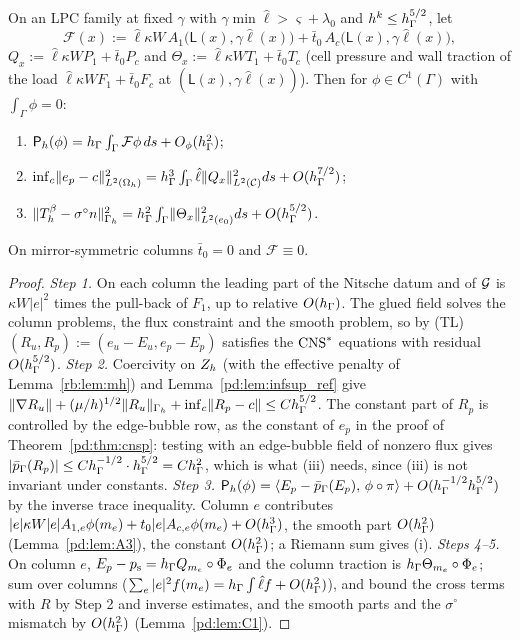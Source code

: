 \begin{theorem}\label{pd:thm:ts}
On an LPC family at fixed $\gamma$ with $\gamma\min\hat\ell>\varsigma+\lambda_0$ and $h^k\le h_\Gamma^{5/2}$, let
\[
\mathcal F(x):=\hat\ell\kappa W\,A_1\bigl(\mathsf L(x),\gamma\hat\ell(x)\bigr)+\bar t_0\,A_c\bigl(\mathsf L(x),\gamma\hat\ell(x)\bigr),
\]
$Q_x:=\hat\ell\kappa WP_1+\bar t_0P_c$ and $\Theta_x:=\hat\ell\kappa WT_1+\bar t_0T_c$ (cell pressure and wall traction of the load $\hat\ell\kappa WF_1+\bar t_0F_c$ at $(\mathsf L(x),\gamma\hat\ell(x))$). Then for $\phi\in C^1(\Gamma)$ with $\int_\Gamma\phi=0$:
\begin{enumerate}[label=(\roman*)]
\item $\mathsf P_h(\phi)=h_\Gamma\int_\Gamma\mathcal F\phi\,ds+O_\phi(h_\Gamma^2)$;
\item $\inf_c\lVert e_p-c\rVert^2_{L^2(\Omega_h)}=h_\Gamma^3\int_\Gamma\hat\ell\lVert Q_x\rVert^2_{L^2(\mathcal C)}ds+O(h_\Gamma^{7/2})$;
\item $\lVert T^\beta_h-\sigma^\circ n\rVert^2_{\Gamma_h}=h_\Gamma^2\int_\Gamma\lVert \Theta_x\rVert^2_{L^2(e_0)}ds+O(h_\Gamma^{5/2})$.
\end{enumerate}
On mirror-symmetric columns $\bar t_0=0$ and $\mathcal F\equiv0$.
\end{theorem}

\begin{proof}
\emph{Step 1.} On each column the leading part of the Nitsche datum and of $\mathcal G$ is $\kappa W|e|^2$ times the pull-back of $F_1$, up to relative $O(h_\Gamma)$. The glued field solves the column problems, the flux constraint and the smooth problem, so by (TL) $(R_u,R_p):=(e_u-E_u,e_p-E_p)$ satisfies the $\mathrm{CNS}^\ast$ equations with residual $O(h_\Gamma^{5/2})$.
\emph{Step 2.} Coercivity on $Z_h$ (with the effective penalty of Lemma~\ref{rb:lem:mh}) and Lemma~\ref{pd:lem:infsup_ref} give $\lVert \nabla R_u\rVert+(\mu/h)^{1/2}\lVert R_u\rVert_{\Gamma_h}+\inf_c\lVert R_p-c\rVert\le Ch_\Gamma^{5/2}$. The constant part of $R_p$ is controlled by the edge-bubble row, as the constant of $e_p$ in the proof of Theorem~\ref{pd:thm:cnsp}: testing with an edge-bubble field of nonzero flux gives $|\bar p_{\Gamma}(R_p)|\le Ch_\Gamma^{-1/2}\cdot h_\Gamma^{5/2}=Ch_\Gamma^2$, which is what (iii) needs, since (iii) is not invariant under constants.
\emph{Step 3.} $\mathsf P_h(\phi)=\langle E_p-\bar p_{\Gamma}(E_p),\, \phi\circ\pi\rangle+O(h_\Gamma^{-1/2}h_\Gamma^{5/2})$ by the inverse trace inequality. Column $e$ contributes $|e|\kappa W|e|A_{1,e}\phi(m_e)+t_0|e|A_{c,e}\phi(m_e)+O(h_\Gamma^3)$, the smooth part $O(h_\Gamma^2)$ (Lemma~\ref{pd:lem:A3}), the constant $O(h_\Gamma^2)$; a Riemann sum gives (i).
\emph{Steps 4--5.} On column $e$, $E_p-p_{\rm s}=h_\Gamma Q_{m_e}\circ\Phi_e$ and the column traction is $h_\Gamma\Theta_{m_e}\circ\Phi_e$; sum over columns ($\sum_e|e|^2f(m_e)=h_\Gamma\int\hat\ell f+O(h_\Gamma^2)$), and bound the cross terms with $R$ by Step 2 and inverse estimates, and the smooth parts and the $\sigma^\circ$ mismatch by $O(h_\Gamma^2)$ (Lemma~\ref{pd:lem:C1}).
\end{proof}

